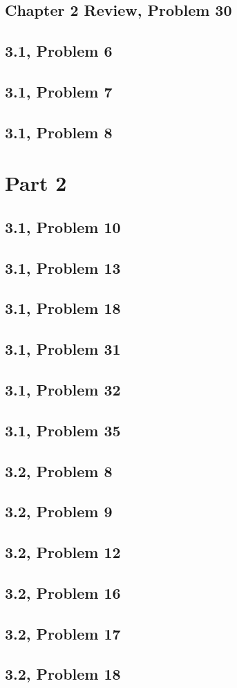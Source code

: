 \documentclass[10pt]{mypackage}
\begin{document}
\subsection{Chapter 2 Review, Problem 30}%
\subsection{3.1, Problem 6}%
\subsection{3.1, Problem 7}%
\subsection{3.1, Problem 8}%
\section{Part 2}%
\subsection{3.1, Problem 10}%
\subsection{3.1, Problem 13}%
\subsection{3.1, Problem 18}%
\subsection{3.1, Problem 31}%
\subsection{3.1, Problem 32}%
\subsection{3.1, Problem 35}%
\subsection{3.2, Problem 8}%
\subsection{3.2, Problem 9}%
\subsection{3.2, Problem 12}%
\subsection{3.2, Problem 16}%
\subsection{3.2, Problem 17}%
\subsection{3.2, Problem 18}%
\end{document}
